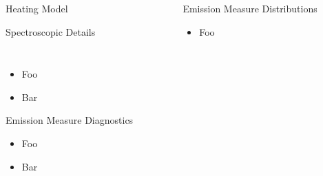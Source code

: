 \documentclass[final]{beamer}
\begin{document}
\begin{frame}
\begin{columns}[T]
\begin{column}{0.49\linewidth}
\begin{block}{Heating Model}
    \end{block}
    \begin{block}{Spectroscopic Details}
      \begin{columns}[T]
      \begin{column}{0.49\columnwidth}
        \vspace{-2ex}
        \begin{figure}
        \end{figure}
      \end{column}
      \begin{column}{0.49\columnwidth}
        \vspace{-6ex}
        \begin{figure}
        \end{figure}
        \vspace{-2ex}
      \end{column}
      \end{columns}
      \begin{itemize}
      \item Foo
      \item Bar
      \end{itemize}
    \end{block}
    \begin{block}{Emission Measure Diagnostics}
      \vspace{-1ex}
      \begin{itemize}
      \item Foo
      \item Bar
      \end{itemize}
      \vspace{-2ex}
      \begin{figure}
      \end{figure}
      \vspace{-2ex}
    \end{block}
  \end{column}
  \begin{column}{0.49\linewidth}
    \begin{block}{Emission Measure Distributions}
      \vspace{-1ex}
      \begin{itemize}
      \item Foo

\end{itemize}
\end{block}
\end{column}
\end{columns}
\end{frame}
\end{document}
